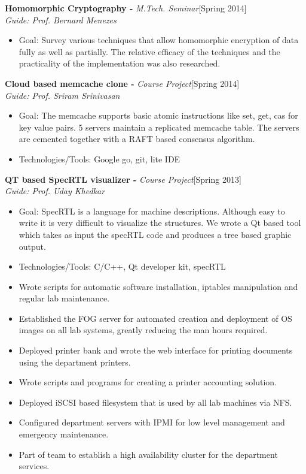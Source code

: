 \documentclass[a4paper,10pt]{article}
\newcommand{\header}[1]{
\begin{center}
\fbox{\begin{minipage}{\textwidth}
\raggedright \large \bf #1
\end{minipage}}
\end{center}
\vspace{-0.3cm}
}
\begin{document}
\noindent
\textbf{Homomorphic Cryptography -} \emph{M.Tech. Seminar}\hfill[Spring 2014] \\
\emph{Guide: Prof. Bernard Menezes}
\begin{itemize}
 \item Goal: Survey various techniques that allow homomorphic encryption of data fully as well as partially. The relative efficacy of the techniques and the practicality of the implementation was also researched.
\end{itemize}

\noindent
\textbf{Cloud based memcache clone -} \emph{Course Project}\hfill[Spring 2014] \\
\emph{Guide: Prof. Sriram Srinivasan}
\begin{itemize}
 \item Goal: The memcache supports basic atomic instructions like set, get, cas for key value pairs. 5 servers maintain a replicated memcache table. The servers are cemented together with a RAFT based consensus algorithm.
 \item Technologies/Tools: Google go, git, lite IDE
\end{itemize}

\noindent
\textbf{QT based SpecRTL  visualizer -} \emph{Course Project}\hfill[Spring 2013] \\
\emph{Guide: Prof. Uday Khedkar}
\begin{itemize}
 \item Goal: SpecRTL is a language for machine descriptions. Although easy to write it is very difficult to visualize the structures. We wrote a Qt based tool which takes as input the specRTL code and produces a tree based graphic output.
 \item Technologies/Tools: C/C++, Qt developer kit, specRTL
\end{itemize}
\endgroup

\vspace{-0.8cm}
\header{RA Work - System Administrator}
\vspace{-0.2cm}
\begin{itemize}
 \item Wrote scripts for automatic software installation, iptables manipulation and regular lab maintenance.
 \item Established the FOG server for automated creation and deployment of OS images on all lab systems, greatly reducing the man hours required.
 \item Deployed printer bank and wrote the web interface for printing documents using the department printers.
 \item Wrote scripts and programs for creating a printer accounting solution.
 \item Deployed iSCSI based filesystem that is used by all lab machines via NFS.
 \item Configured department servers with IPMI for low level management and emergency maintenance.
 \item Part of team to establish a high availability cluster for the department services.
\end{itemize}
\end{document}
